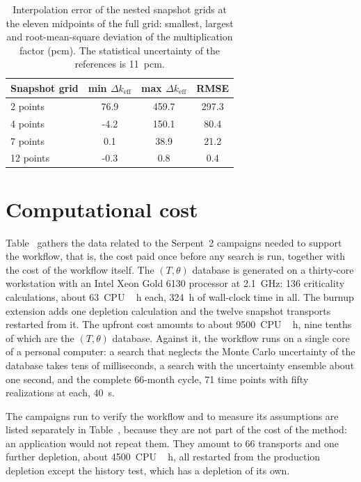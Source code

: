 \begin{table}[htbp]
  \centering
  \caption[Interpolation error against snapshot-grid density]{Interpolation
  error of the nested snapshot grids at the eleven midpoints of the full grid:
  smallest, largest and root-mean-square deviation of the multiplication
  factor (pcm). The statistical uncertainty of the references is
  \SI{11}{pcm}.}
  \label{cs:tab:grid}
  \begin{tabular}{lS[table-format=-2.1]S[table-format=3.1]S[table-format=3.1]}
    \toprule
    Snapshot grid & {min $\Delta k_{\mathrm{eff}}$} & {max $\Delta k_{\mathrm{eff}}$} & {RMSE} \\
     points &  76.9 & 459.7 & 297.3 \\
     4 points &  -4.2 & 150.1 &  80.4 \\
     7 points &   0.1 &  38.9 &  21.2 \\
    12 points &  -0.3 &   0.8 &   0.4 \\
    \bottomrule
  \end{tabular}
\end{table}

\section{Computational cost}\label{cs:sec:cost}

Table~ gathers the data related to the Serpent~2 campaigns
needed to support the workflow, that is, the cost paid once before any search is run, together with the
cost of the workflow itself. The $(T,\theta)$ database is
generated on a thirty-core workstation with an Intel Xeon Gold 6130 processor
at \SI{2.1}{GHz}: 136 criticality calculations, about \SI{63}{CPU\,h} each,
\SI{324}{h} of wall-clock time in all. The burnup extension adds one depletion
calculation and the twelve snapshot transports restarted from it. The upfront
cost amounts to about \SI{9500}{CPU\,h}, nine tenths of which are the
$(T,\theta)$ database. Against it, the workflow runs on a single core of a
personal computer: a search that neglects the Monte Carlo uncertainty of the
database takes tens of milliseconds, a search
with the uncertainty ensemble about one second, and the complete 66-month
cycle, 71 time points with fifty realizations at each, \SI{40}{s}.

The campaigns run to verify the workflow and to measure its assumptions are
listed separately in Table~, because they are not part
of the cost of the method: an application would not repeat them. They amount to
66 transports and one further depletion, about \SI{4500}{CPU\,h}, all
restarted from the production depletion except the history test, which has a
depletion of its own.

